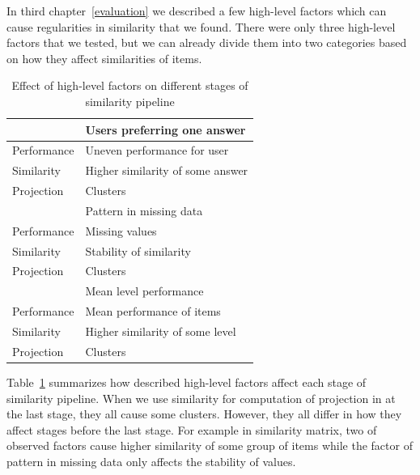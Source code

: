 \documentclass[
  printed, %
  table,   %
  nolof,     %
  nolot,     %
  color,
  final,
  nocover
]{fithesis3}
\begin{document}

In third chapter~\ref{evaluation} we described a few high-level factors which can cause regularities in similarity that we found. There were only three high-level factors that we tested, but we can already divide them into two categories based on how they affect similarities of items.

\begin{table}
  \begin{tabular}{ | l | l | }
      \hline
      \cellcolor[gray]{1.0} & Users preferring one answer \\
      \hline
      Performance & Uneven performance for user      \\
      Similarity  & Higher similarity of some answer \\
      Projection  & Clusters                         \\
      \hline
      \hline
      \cellcolor[gray]{1.0} & Pattern in missing data     \\
      \hline
      Performance & Missing values                   \\
      Similarity  & Stability of similarity          \\
      Projection  & Clusters                         \\
      \hline
      \hline
      \cellcolor[gray]{1.0} & Mean level performance      \\
      \hline
      Performance & Mean performance of items        \\
      Similarity  & Higher similarity of some level  \\
      Projection  & Clusters                         \\
      \hline
  \end{tabular}
  \caption{Effect of high-level factors on different stages of similarity pipeline}
  \label{tab:effect-of-factors-on-stages}
\end{table}

Table~\ref{tab:effect-of-factors-on-stages} summarizes how described high-level factors affect each stage of similarity pipeline. When we use similarity for computation of projection in at the last stage, they all cause some clusters. However, they all differ in how they affect stages before the last stage. For example in similarity matrix, two of observed factors cause higher similarity of some group of items while the factor of pattern in missing data only affects the stability of values.
\end{document}
